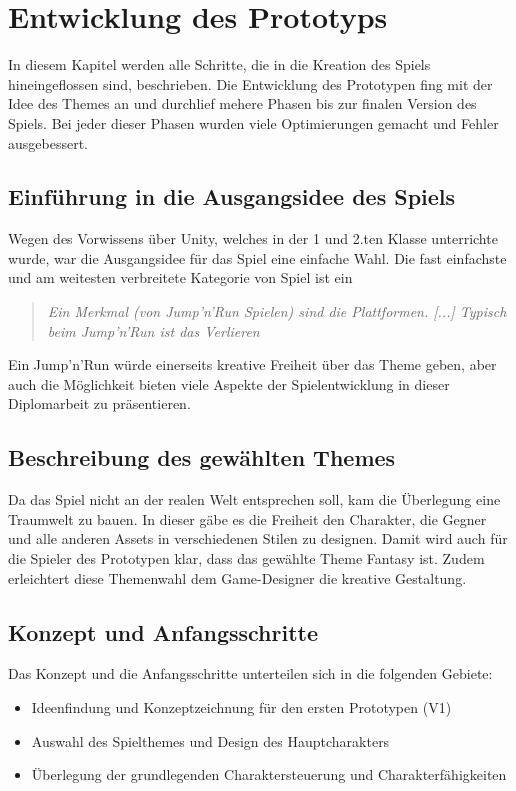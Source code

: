 \pagebreak
\chapter{Entwicklung des Prototyps}

In diesem Kapitel werden alle Schritte, die in die Kreation des Spiels hineingeflossen sind, beschrieben. Die Entwicklung des Prototypen fing mit der Idee des Themes an und durchlief mehere Phasen bis zur finalen Version des Spiels. Bei jeder dieser Phasen wurden viele Optimierungen gemacht und Fehler ausgebessert. 

\section{Einführung in die Ausgangsidee des Spiels}

Wegen des Vorwissens über Unity, welches in der 1 und 2.ten Klasse unterrichte wurde, war die Ausgangsidee für das Spiel eine einfache Wahl. Die fast einfachste und am weitesten verbreitete Kategorie von Spiel ist ein 

\begin{quote}
  \emph{\glqq Ein Merkmal (von Jump'n'Run Spielen) sind die Plattformen. [...] Typisch beim Jump'n'Run ist das Verlieren\grqq}~\cite[Art of Gaming; 1:42-1:57]{ArtOfGaming}
\end{quote}

Ein Jump'n'Run würde einerseits kreative Freiheit über das Theme geben, aber auch die Möglichkeit bieten viele Aspekte der Spielentwicklung in dieser Diplomarbeit zu präsentieren.

\section{Beschreibung des gewählten Themes}

Da das Spiel nicht an der realen Welt entsprechen soll, kam die Überlegung eine Traumwelt zu bauen. In dieser gäbe es die Freiheit den Charakter, die Gegner und alle anderen Assets in verschiedenen Stilen zu designen. Damit wird auch für die Spieler des Prototypen klar, dass das gewählte Theme Fantasy ist. Zudem erleichtert diese Themenwahl dem Game-Designer die kreative Gestaltung.

\pagebreak

\section{Konzept und Anfangsschritte}
Das Konzept und die Anfangsschritte unterteilen sich in die folgenden Gebiete: 
\begin{itemize}
  \item Ideenfindung und Konzeptzeichnung für den ersten Prototypen (V1)
  \item Auswahl des Spielthemes und Design des Hauptcharakters
  \item Überlegung der grundlegenden Charaktersteuerung und Charakterfähigkeiten
\end{itemize}

